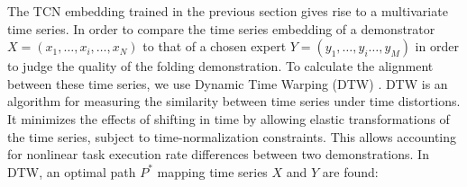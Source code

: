 \documentclass[\home/main.tex]{subfiles}
\begin{document}
The TCN embedding trained in the previous section gives rise to a multivariate time series. In order to compare the time series embedding of a demonstrator $X = (x_1, \ldots, x_i, \ldots, x_N)$ to that of a chosen expert $Y = (y_1, \ldots, y_i \ldots, y_M)$ in order to judge the quality of the folding demonstration. To calculate the alignment between these time series, we use Dynamic Time Warping (DTW) \autocite{Bellman1959}. DTW is an algorithm for measuring the similarity between time series under time distortions. It minimizes the effects of shifting in time by allowing elastic transformations of the time series, subject to time-normalization constraints. This allows accounting for nonlinear task execution rate differences between two demonstrations. In DTW, an optimal path $P^*$ mapping time series $X$ and $Y$ are found:

\end{document}
